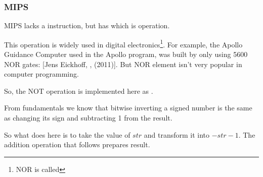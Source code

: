 ﻿\subsubsection{MIPS}




MIPS lacks a \NOT instruction, but has \NOR which is  operation.

This operation is widely used in digital electronics\footnote{NOR is called }.
For example, the Apollo Guidance Computer used in the Apollo program, 
was built by only using 5600 NOR gates:
[Jens Eickhoff, , (2011)].
But NOR element isn't very popular in computer programming.

So, the NOT operation is implemented here as .

From fundamentals  we know that bitwise inverting a signed number is the same 
as changing its sign and subtracting 1 from the result.

So what \NOT does here is to take the value of $str$ and transform it into $-str-1$.
The addition operation that follows prepares result.

